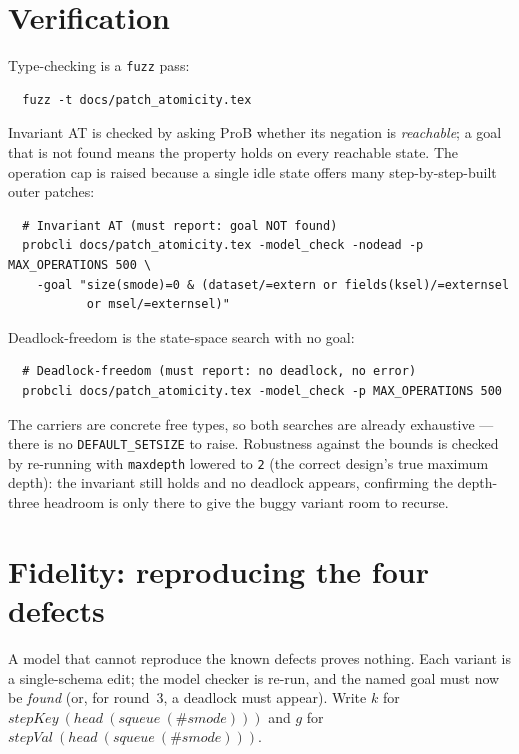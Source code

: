 \documentclass[a4paper,10pt,fleqn]{article}
\begin{document}
\section{Verification}
\label{sec:verify}

Type-checking is a \texttt{fuzz} pass:
\begin{verbatim}
  fuzz -t docs/patch_atomicity.tex
\end{verbatim}

Invariant AT is checked by asking ProB whether its negation is \emph{reachable};
a goal that is not found means the property holds on every reachable state.  The
operation cap is raised because a single idle state offers many
step-by-step-built outer patches:
\begin{verbatim}
  # Invariant AT (must report: goal NOT found)
  probcli docs/patch_atomicity.tex -model_check -nodead -p MAX_OPERATIONS 500 \
    -goal "size(smode)=0 & (dataset/=extern or fields(ksel)/=externsel
           or msel/=externsel)"
\end{verbatim}

Deadlock-freedom is the state-space search with no goal:
\begin{verbatim}
  # Deadlock-freedom (must report: no deadlock, no error)
  probcli docs/patch_atomicity.tex -model_check -p MAX_OPERATIONS 500
\end{verbatim}

The carriers are concrete free types, so both searches are already exhaustive ---
there is no \texttt{DEFAULT\_SETSIZE} to raise.  Robustness against the bounds is
checked by re-running with \texttt{maxdepth} lowered to \texttt{2} (the correct
design's true maximum depth): the invariant still holds and no deadlock appears,
confirming the depth-three headroom is only there to give the buggy variant room
to recurse.

\section{Fidelity: reproducing the four defects}
\label{sec:fidelity}

A model that cannot reproduce the known defects proves nothing.  Each variant is
a single-schema edit; the model checker is re-run, and the named goal must now be
\emph{found} (or, for round~3, a deadlock must appear).  Write $k$ for
$stepKey~(head~(squeue~(\# smode)))$ and $g$ for
$stepVal~(head~(squeue~(\# smode)))$.
\end{document}
